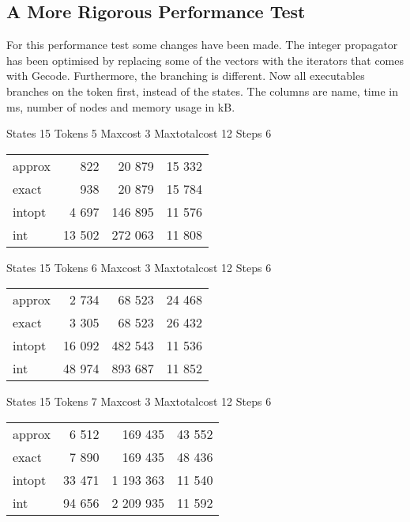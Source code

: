 \documentclass[a4paper,11pt]{article}
\begin{document}
\subsection{A More Rigorous Performance Test}
For this performance test some changes have been made. The integer propagator has been optimised by replacing some of the vectors with the iterators that comes with Gecode. Furthermore, the branching is different. Now all executables branches on the token first, instead of the states. The columns are name, time in ms, number of nodes and memory usage in kB.

\begin{table}
States 15 Tokens 5 Maxcost 3 Maxtotalcost 12 Steps 6 \\
\begin{tabular}{l r r r}
approx & 822 & 20 879 & 15 332 \\
exact & 938 & 20 879 & 15 784 \\
intopt & 4 697 & 146 895 & 11 576 \\
int & 13 502 & 272 063 & 11 808 \\
\end{tabular}
\end{table}

\begin{table}
States 15 Tokens 6 Maxcost 3 Maxtotalcost 12 Steps 6 \\
\begin{tabular}{l r r r}
approx & 2 734 & 68 523 & 24 468 \\
exact & 3 305 & 68 523 & 26 432 \\
intopt & 16 092 & 482 543 & 11 536 \\
int & 48 974 & 893 687 & 11 852 \\
\end{tabular}
\end{table}

\begin{table}
States 15 Tokens 7 Maxcost 3 Maxtotalcost 12 Steps 6 \\
\begin{tabular}{l r r r}
approx & 6 512 & 169 435 & 43 552 \\
exact & 7 890 & 169 435 & 48 436 \\
intopt & 33 471 & 1 193 363 & 11 540 \\
int & 94 656 & 2 209 935 & 11 592 \\
\end{tabular}
\end{table}
\end{document}
